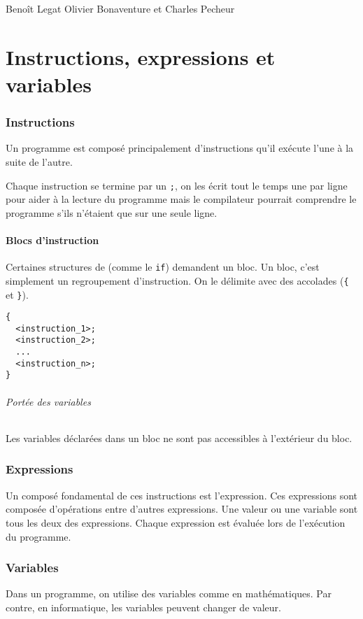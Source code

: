 

{Beno\^it Legat}
{Olivier Bonaventure et Charles Pecheur}


\part{Instructions, expressions et variables}

\section{Instructions}
Un programme est composé principalement d'instructions qu'il exécute l'une à la
suite de l'autre.

Chaque instruction se termine par un \lstinline|;|, on les écrit tout le temps
une par ligne pour aider à la lecture du programme mais le compilateur
pourrait comprendre le programme s'ils n'étaient que sur une seule ligne.

\subsection{Blocs d'instruction}
Certaines structures de \java{} (comme le \lstinline|if|) demandent un bloc.
Un bloc, c'est simplement un regroupement d'instruction.
On le délimite avec des accolades
(\lstinline|{| et \lstinline|}|).
\begin{lstlisting}
{
  <instruction_1>;
  <instruction_2>;
  ...
  <instruction_n>;
}
\end{lstlisting}

\paragraph{Portée des variables}
Les variables déclarées dans un bloc ne sont pas accessibles à l'extérieur
du bloc.

\section{Expressions}
Un composé fondamental de ces instructions est l'expression.
Ces expressions sont composée d'opérations entre d'autres expressions.
Une valeur ou une variable sont tous les deux des expressions.
Chaque expression est évaluée lors de l'exécution du programme.

\section{Variables}
Dans un programme, on utilise des variables comme en mathématiques.
Par contre, en informatique, les variables peuvent changer de valeur.

